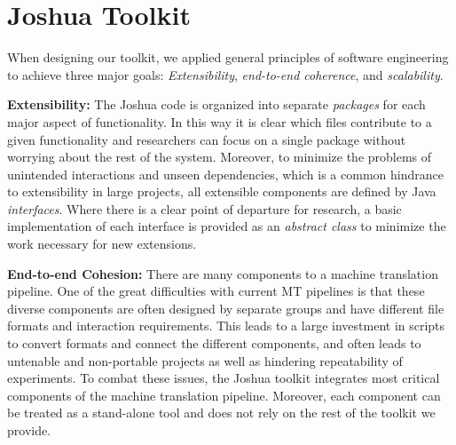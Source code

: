 \documentclass[11pt]{article}
\begin{document}


\section{Joshua Toolkit}
When designing our toolkit, we applied general principles of software engineering
to achieve three major goals: \emph{Extensibility}, \emph{end-to-end coherence},
and \emph{scalability}.

\textbf{Extensibility:} The Joshua code is organized into separate \emph{packages}
for each major aspect of functionality.  In this way it is clear which files
contribute to a given functionality and researchers can focus on a single package
without worrying about the rest of the system.  Moreover, to minimize the problems
of unintended interactions and unseen dependencies, which is a common hindrance to
extensibility in large projects, all extensible components are defined by Java
\emph{interfaces}.  Where there is a clear point of departure for research, a basic
implementation of each interface is provided as an \emph{abstract class} to minimize
the work necessary for new extensions.

\textbf{End-to-end Cohesion:} There are many components to a machine translation
pipeline.  One of the great difficulties with current MT pipelines is that these
diverse components are often designed by separate groups and have different file
formats and interaction requirements.  This leads to a large investment in scripts
to convert formats and connect the different components, and often leads to untenable
and non-portable projects as well as hindering repeatability of experiments.  To combat
these issues, the Joshua toolkit integrates most critical components of the machine
translation pipeline.  Moreover, each component can be treated as a stand-alone tool
and does not rely on the rest of the toolkit we provide.
\end{document}
